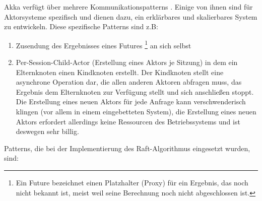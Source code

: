 Akka verfügt über mehrere Kommunikationspatterns \cite{akka}. Einige von ihnen sind für Aktorsysteme spezifisch und dienen dazu, ein erklärbares und skalierbares System zu entwickeln. Diese spezifische Patterns sind z.B:

\begin{enumerate}
	\item Zusendung des Ergebnisses eines Futures \footnote{Ein Future bezeichnet einen Platzhalter (Proxy) für ein Ergebnis, das noch nicht bekannt ist, meist weil seine Berechnung noch nicht abgeschlossen ist.} an sich selbst
	
	\item Per-Session-Child-Actor (Erstellung eines Aktors je Sitzung) in dem ein Elternknoten einen Kindknoten erstellt. Der Kindknoten stellt eine asynchrone Operation dar, die allen anderen Aktoren abfragen muss, das Ergebnis dem Elternknoten zur Verfügung stellt und sich anschließen stoppt. Die Erstellung eines neuen Aktors für jede Anfrage kann verschwenderisch klingen (vor allem in einem eingebetteten System), die Erstellung eines neuen Aktors erfordert allerdings keine Ressourcen des Betriebssystems und ist deswegen sehr billig.
\end{enumerate}

Patterns, die bei der Implementierung des Raft-Algorithmus eingesetzt wurden, sind:

